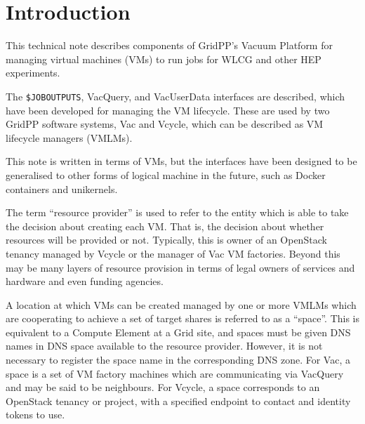\documentclass[12pt,a4paper]{article}
\begin{document}
\cleardoublepage

\renewcommand{\thefootnote}{\arabic{footnote}}
\setcounter{footnote}{0}


\pagestyle{plain} %
\setcounter{page}{1}

\linenumbers

\section{Introduction}
\label{sec:Introduction}

This technical note describes components of GridPP's Vacuum Platform for 
managing virtual machines (VMs) to run jobs for WLCG and other HEP 
experiments.

The \texttt{\$JOBOUTPUTS}, VacQuery, and VacUserData interfaces are described, 
which have been developed for managing the VM lifecycle. These are used 
by two GridPP software systems, Vac and Vcycle, which can be described 
as VM lifecycle managers (VMLMs).

This note is written in terms of VMs, but the interfaces have been 
designed to be generalised to other forms of logical machine in the
future, such as Docker containers and unikernels.

The term ``resource provider'' is used to refer to the entity which is 
able to take the decision about creating each VM. That is, the decision 
about whether resources will be provided or not. Typically, this is owner 
of an OpenStack tenancy managed by Vcycle or the manager of Vac VM 
factories. Beyond this may be many layers of resource provision
in terms of legal owners of services and hardware and even funding agencies.

A location at which VMs can be created managed by one or more VMLMs
which are cooperating to achieve a set of target shares is referred to
as a ``space''. This is equivalent to a Compute Element at a Grid site,
and spaces must be given DNS names in DNS space available to the
resource provider. However, it is not necessary to register the 
space name in the corresponding DNS zone. For Vac, a space is a set
of VM factory machines which are communicating via VacQuery and may
be said to be neighbours. For Vcycle, a space corresponds to an 
OpenStack tenancy or project, with a specified endpoint to contact
and identity tokens to use.
\end{document}
